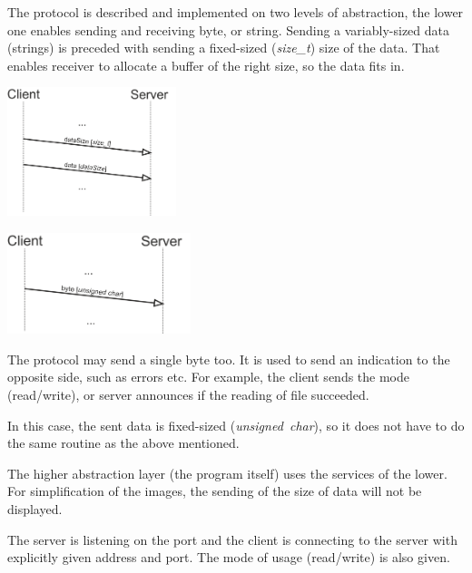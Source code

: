 \documentclass[10pt,a4paper,titlepage]{article}
\begin{document}
\begin{multicols}{2}
The protocol is described and implemented on two levels of abstraction,
the lower one enables sending and receiving byte, or string. Sending a
variably-sized data (strings) is preceded with sending a fixed-sized
({\it size\_t}) size of the data. That enables receiver to allocate a
buffer of the right size, so the data fits in.

\includegraphics[width=0.37\textwidth]{send_data.png}
\end{multicols}


\begin{multicols}{2}
\includegraphics[width=0.4\textwidth]{send_byte.png}

The protocol may send a single byte too. It is used to send an indication
to the opposite side, such as errors etc. For example, the client sends
the mode (read/write), or server announces if the reading of file succeeded.

In this case, the sent data is fixed-sized ({\it unsigned~char}),
so it does not have to do the same routine as the above mentioned.
\end{multicols}

The higher abstraction layer (the program itself) uses the services
of the lower. For simplification of the images, the sending of the size
of data will not be displayed.

The server is listening on the port and the client is connecting
to the server with explicitly given address and port. The mode
of usage (read/write) is also given.
\end{document}
